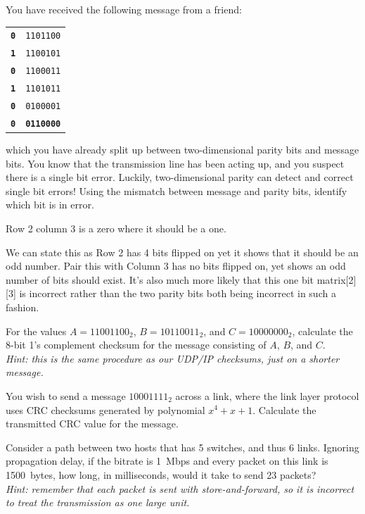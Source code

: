 \documentclass[12pt,addpoints,answers]{exam}
\begin{document}
\begin{questions}
\newpage
\question[6] You have received the following message from a friend:
\begin{center}
\begin{tabular}{c|c}
\texttt{\textbf{0}} & \texttt{1101100} \\
\texttt{\textbf{1}} & \texttt{1100101} \\ %
\texttt{\textbf{0}} & \texttt{1100011} \\
\texttt{\textbf{1}} & \texttt{1101011} \\
\texttt{\textbf{0}} & \texttt{0100001} \\\midrule
\texttt{\textbf{0}} & \textbf{\texttt{0110000}}
\end{tabular}
\end{center}
which you have already split up between two-dimensional parity bits and message bits. You know that the transmission line has been acting up, and you suspect there is a single bit error. Luckily, two-dimensional parity can detect and correct single bit errors! Using the mismatch between message and parity bits, identify which bit is in error.
\begin{solution}[10em]
	Row 2 column 3 is a zero where it should be a one.
	
	We can state this as Row 2 has 4 bits flipped on yet it shows that it should be an odd number.  Pair this with Column 3 has no bits flipped on, yet shows an odd number of bits should exist.  It's also much more likely that this one bit matrix[2][3] is incorrect rather than the two parity bits both being incorrect in such a fashion.
\end{solution}
\vfill

\question[4] For the values $A = 11001100_2$, $B = 10110011_2$, and $C = 10000000_2$, calculate the 8-bit 1's complement checksum for the message consisting of $A$, $B$, and $C$.\\\emph{Hint: this is the same procedure as our UDP/IP checksums, just on a shorter message.}
\begin{solution}[10em]
\end{solution}
\vfill

\newpage
\question[8] You wish to send a message $10001111_2$ across a link, where the link layer protocol uses CRC checksums generated by polynomial $x^4+x+1$. Calculate the transmitted CRC value for the message.
\begin{solution}[10em]
\end{solution}
\vfill

\question[5] Consider a path between two hosts that has 5 switches, and thus 6 links. Ignoring propagation delay, if the bitrate is \SI{1}{Mbps} and every packet on this link is \SI{1500}{bytes}, how long, in milliseconds, would it take to send 23 packets?\\\emph{Hint: remember that each packet is sent with store-and-forward, so it is incorrect to treat the transmission as one large unit.}
\begin{solution}[10em]
\end{solution}
\vfill


\end{questions}
\end{document}
